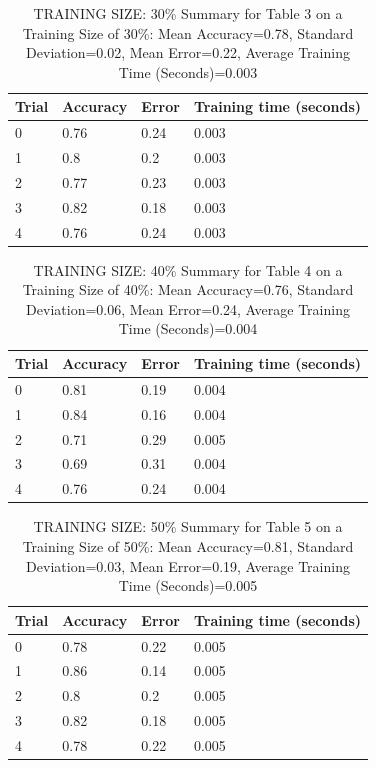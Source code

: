 \documentclass{article}
\begin{document}
\begin{table}[H]

\centering
{\begin{tabular}{||p{1cm}|p{1.8cm}|p{1.8cm}|p{3cm}||}
 \hline
Trial & Accuracy & Error & Training time (seconds) \\ [0.5ex] 
 \hline\hline
   0  & 0.76  & 0.24  & 0.003\\
\hline
   1  & 0.8  & 0.2  & 0.003\\
\hline
   2  & 0.77  & 0.23  & 0.003\\
\hline
   3  & 0.82  & 0.18  & 0.003\\
\hline
   4  & 0.76  & 0.24  & 0.003\\
 \hline
\end{tabular}}
\caption{TRAINING SIZE: 30\% \newline Summary for Table 3 on a Training Size of 30\%: Mean Accuracy=0.78, Standard Deviation=0.02, Mean Error=0.22, Average Training Time (Seconds)=0.003}
\end{table} 

\begin{table}[H]

\centering
{\begin{tabular}{||p{1cm}|p{1.8cm}|p{1.8cm}|p{3cm}||}
 \hline
Trial & Accuracy & Error & Training time (seconds) \\ [0.5ex] 
 \hline\hline
   0  & 0.81  & 0.19  & 0.004\\
\hline
   1  & 0.84  & 0.16  & 0.004\\
\hline
   2  & 0.71  & 0.29  & 0.005\\
\hline
   3  & 0.69  & 0.31  & 0.004\\
\hline
   4  & 0.76  & 0.24  & 0.004\\
 \hline
\end{tabular}}
\caption{TRAINING SIZE: 40\% \newline Summary for Table 4 on a Training Size of 40\%: Mean Accuracy=0.76, Standard Deviation=0.06, Mean Error=0.24, Average Training Time (Seconds)=0.004}
\end{table} 

\begin{table}[H]

\centering
{\begin{tabular}{||p{1cm}|p{1.8cm}|p{1.8cm}|p{3cm}||}
 \hline
Trial & Accuracy & Error & Training time (seconds) \\ [0.5ex] 
 \hline\hline
0  & 0.78  & 0.22  & 0.005\\
\hline
   1  & 0.86  & 0.14  & 0.005\\
\hline
   2  & 0.8  & 0.2  & 0.005\\
\hline
   3  & 0.82  & 0.18  & 0.005\\
\hline
   4  & 0.78  & 0.22  & 0.005\\
 \hline
\end{tabular}}
\caption{TRAINING SIZE: 50\% \newline Summary for Table 5 on a Training Size of 50\%: Mean Accuracy=0.81, Standard Deviation=0.03, Mean Error=0.19, Average Training Time (Seconds)=0.005}
\end{table} 
\end{document}
